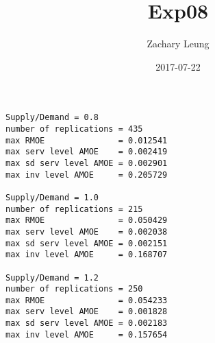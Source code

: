 \documentclass[12pt]{article}
\title{Exp08}
\author{Zachary Leung}
\date{2017-07-22}
\begin{document}

\maketitle


\begin{verbatim}
Supply/Demand = 0.8
number of replications = 435
max RMOE               = 0.012541
max serv level AMOE    = 0.002419
max sd serv level AMOE = 0.002901
max inv level AMOE     = 0.205729

Supply/Demand = 1.0
number of replications = 215
max RMOE               = 0.050429
max serv level AMOE    = 0.002038
max sd serv level AMOE = 0.002151
max inv level AMOE     = 0.168707

Supply/Demand = 1.2
number of replications = 250
max RMOE               = 0.054233
max serv level AMOE    = 0.001828
max sd serv level AMOE = 0.002183
max inv level AMOE     = 0.157654
\end{verbatim}
\end{document}
